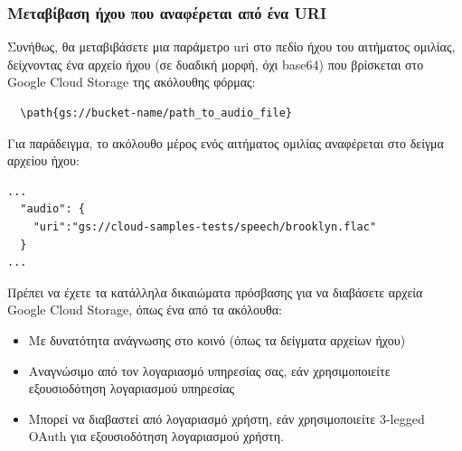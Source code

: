\documentclass[oneside, 12pt]{book}
\begin{document}
\subsubsection{Mεταβίβαση ήχου που αναφέρεται από ένα URI}
Συνήθως, θα μεταβιβάσετε μια παράμετρο uri στο πεδίο ήχου του αιτήματος ομιλίας, δείχνοντας ένα αρχείο ήχου (σε δυαδική μορφή, όχι base64) που βρίσκεται στο Google Cloud Storage της ακόλουθης φόρμας:
\begin{lstlisting}
  \path{gs://bucket-name/path_to_audio_file}
\end{lstlisting}
Για παράδειγμα, το ακόλουθο μέρος ενός αιτήματος ομιλίας αναφέρεται στο δείγμα αρχείου ήχου:
\begin{lstlisting}
...
  "audio": {
    "uri":"gs://cloud-samples-tests/speech/brooklyn.flac"
  }
...
\end{lstlisting}
Πρέπει να έχετε τα κατάλληλα δικαιώματα πρόσβασης για να διαβάσετε αρχεία Google Cloud Storage, όπως ένα από τα ακόλουθα:
\begin{itemize}
  \item Με δυνατότητα ανάγνωσης στο κοινό (όπως τα δείγματα αρχείων ήχου)
  \item Αναγνώσιμο από τον λογαριασμό υπηρεσίας σας, εάν χρησιμοποιείτε εξουσιοδότηση λογαριασμού υπηρεσίας
  \item Μπορεί να διαβαστεί από λογαριασμό χρήστη, εάν χρησιμοποιείτε 3-legged OAuth για εξουσιοδότηση λογαριασμού χρήστη.
\end{itemize}
\end{document}
